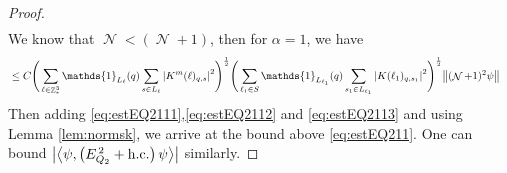 \documentclass[12pt,a4paper]{article}
\numberwithin{equation}{section}
\newcommand{\1}{\mathbb{I}}
\DeclareMathOperator{\Z}{\mathbb{Z}}
\DeclareMathOperator{\NN}{\mathcal{N}}
\newcommand{\half}{\frac{1}{2}}
\newcommand{\eva}[1]{\left\langle #1 \right\rangle}
\theoremstyle{plain}
\theoremstyle{definition}
\theoremstyle{remark}
\theoremstyle{plain}
\theoremstyle{definition}
\theoremstyle{remark}
\begin{document}
\begin{proof}
\begin{align}
	\end{align}
	We know that $\NN<(\NN+1)$, then for $\alpha = 1$, we have
	\begin{align}
		&\leq C \Bigg(\sum\limits_{\ell\in \Z^3_*}  \mathds{1}_{L_{\ell}}(q) \sum\limits_{s \in L_{\ell}} \abs{K^m(\ell)_{q,s}}^2\Bigg)^\half \Bigg(\sum\limits_{ \ell_1\in S} \mathds{1}_{L_{\ell_1}}(q)\sum\limits_{s_1 \in L_{\ell_1}} \abs{K(\ell_1)_{q,s_1}}^2\Bigg)^\half\norm{ (\NN+1)^2\psi}  \label{eq:estEQ2113c}
	\end{align}
	Then adding \eqref{eq:estEQ2111},\eqref{eq:estEQ2112} and \eqref{eq:estEQ2113} and using Lemma \ref{lem:normsk}, we arrive at the bound above \eqref{eq:estEQ211}. One can bound $\abs{\eva{\psi,\left(E^{\,2}_{Q_2}+\mathrm{h.c.}\right) \psi }}$ similarly.
\end{proof}
\end{document}
